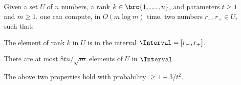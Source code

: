 \begin{lemma}
    Given a set $U$ of $n$ numbers, a rank $k \in \brc{1, \dots, n}$, and
    parameters $t \geq 1$ and $m \geq 1$, one can compute, in
    $O(m \log m)$ time, two numbers $r_{-}, r_+ \in U$, such that:
    \begin{compactenumA}
        \medskip%
        \item The element of rank $k$ in $U$ is in the interval
        $\Interval = [r_-, r_+]$.  \smallskip%
        \smallskip%
        \item There are at most $8 t {n}/ \sqrt{m}$ elements of $U$ in
        $\Interval$.
    \end{compactenumA}
    \medskip%
    The above two properties hold with probability $\geq 1-3/t^2$.
\end{lemma}
